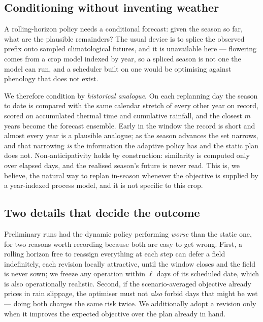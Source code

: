 \documentclass[10pt,twocolumn]{article}
\begin{document}
\subsection{Conditioning without inventing weather}

A rolling-horizon policy needs a conditional forecast: given the season so
far, what are the plausible remainders? The usual device is to splice the
observed prefix onto sampled climatological futures, and it is unavailable
here --- flowering comes from a crop model indexed by year, so a spliced
season is not one the model can run, and a scheduler built on one would be
optimising against phenology that does not exist.

We therefore condition by \emph{historical analogue}. On each replanning day
the season to date is compared with the same calendar stretch of every other
year on record, scored on accumulated thermal time and cumulative rainfall,
and the closest $m$ years become the forecast ensemble. Early in the window
the record is short and almost every year is a plausible analogue; as the
season advances the set narrows, and that narrowing \emph{is} the information
the adaptive policy has and the static plan does not. Non-anticipativity
holds by construction: similarity is computed only over elapsed days, and the
realised season's future is never read. This is, we believe, the natural way
to replan in-season whenever the objective is supplied by a year-indexed
process model, and it is not specific to this crop.

\subsection{Two details that decide the outcome}

Preliminary runs had the dynamic policy performing \emph{worse} than the
static one, for two reasons worth recording because both are easy to get
wrong. First, a rolling horizon free to reassign everything at each step can
defer a field indefinitely, each revision locally attractive, until the
window closes and the field is never sown; we freeze any operation within
$\ell$ days of its scheduled date, which is also operationally realistic.
Second, if the scenario-averaged objective already prices in rain slippage,
the optimiser must not \emph{also} forbid days that might be wet --- doing
both charges the same risk twice. We additionally adopt a revision only when
it improves the expected objective over the plan already in hand.
\end{document}
